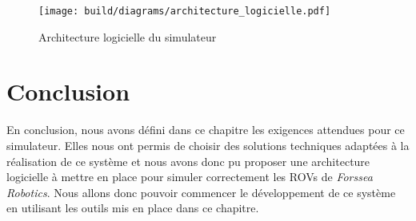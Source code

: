             \begin{figure}[!htb]
                \centering
                \texttt{[image: build/diagrams/architecture\_logicielle.pdf]}
                \caption{Architecture logicielle du simulateur}
                \label{fig:architecture_logicielle}
            \end{figure}

    \section{Conclusion}

        En conclusion, nous avons défini dans ce chapitre les exigences attendues pour ce simulateur. Elles nous ont permis de choisir des solutions techniques adaptées à la réalisation de ce système et nous avons donc pu proposer une architecture logicielle à mettre en place pour simuler correctement les \gls{ROV}s de \textit{Forssea Robotics}. Nous allons donc pouvoir commencer le développement de ce système en utilisant les outils mis en place dans ce chapitre.
        